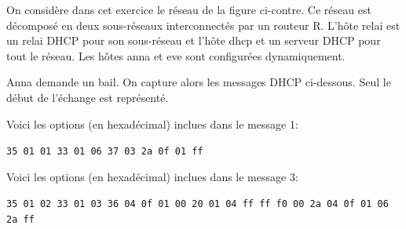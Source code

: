 
\noindent\begin{minipage}{.42\textwidth}
  On considère dans cet exercice le réseau de la figure ci-contre. Ce
  réseau est décomposé en deux sous-réseaux interconnectés par un
  routeur R. L'hôte relai est un relai DHCP pour son sous-réseau et
  l'hôte dhcp et un serveur DHCP pour tout le réseau. Les hôtes anna
  et eve sont configurées dynamiquement.
\end{minipage}
\begin{minipage}{.57\textwidth}
  \begin{center}\centering\end{center}
\end{minipage}

Anna demande un bail. On capture alors les messages DHCP
ci-dessous. Seul le début de l'échange est représenté.
\begin{center}\end{center}

Voici les options (en hexadécimal) inclues dans le message 1:
\begin{center}\tt 35 01 01 33 01 06 37 03 2a 0f 01 ff\end{center}

Voici les options (en hexadécimal) inclues dans le message 3:
\begin{center}\tt 35 01 02 33 01 03 36 04 0f 01 00 20 01 04 ff ff f0 00 2a 04 0f 01 06 2a ff\end{center}
                  
